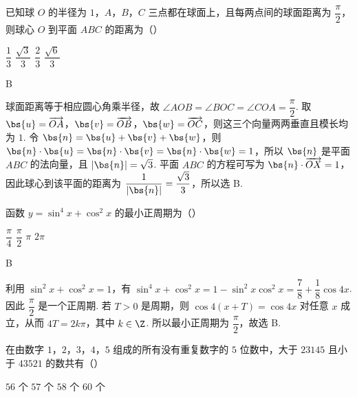 \begin{problem}
已知球 \(O\) 的半径为 \(1\)，\(A\)，\(B\)，\(C\) 三点都在球面上，且每两点间的球面距离为 \(\dfrac{\pi}{2}\)，则球心 \(O\) 到平面 \(ABC\) 的距离为（\quad）

\choices
    {\(\dfrac{1}{3}\)}
    {\(\dfrac{\sqrt3}{3}\)}
    {\(\dfrac{2}{3}\)}
    {\(\dfrac{\sqrt6}{3}\)}
\end{problem}

\begin{answer}
B
\end{answer}

\begin{solution}
球面距离等于相应圆心角乘半径，故 \(\angle AOB=\angle BOC=\angle COA=\dfrac{\pi}{2}\). 取 \(\bs{u}=\overrightarrow{OA}\)，\(\bs{v}=\overrightarrow{OB}\)，\(\bs{w}=\overrightarrow{OC}\)，则这三个向量两两垂直且模长均为 \(1\). 令 \(\bs{n}=\bs{u}+\bs{v}+\bs{w}\)，则 \(\bs{n}\cdot\bs{u}=\bs{n}\cdot\bs{v}=\bs{n}\cdot\bs{w}=1\)，所以 \(\bs{n}\) 是平面 \(ABC\) 的法向量，且 \(\left|\bs{n}\right|=\sqrt3\). 平面 \(ABC\) 的方程可写为 \(\bs{n}\cdot\overrightarrow{OX}=1\)，因此球心到该平面的距离为 \(\dfrac{1}{\left|\bs{n}\right|}=\dfrac{\sqrt3}{3}\)，所以选 B.
\end{solution}

\begin{problem}
函数 \(y=\sin^4x+\cos^2x\) 的最小正周期为（\quad）

\choices
    {\(\dfrac{\pi}{4}\)}
    {\(\dfrac{\pi}{2}\)}
    {\(\pi\)}
    {\(2\pi\)}
\end{problem}

\begin{answer}
B
\end{answer}

\begin{solution}
利用 \(\sin^2x+\cos^2x=1\)，有 \(\sin^4x+\cos^2x=1-\sin^2x\cos^2x=\dfrac{7}{8}+\dfrac{1}{8}\cos4x\). 因此 \(\dfrac{\pi}{2}\) 是一个正周期. 若 \(T>0\) 是周期，则 \(\cos4(x+T)=\cos4x\) 对任意 \(x\) 成立，从而 \(4T=2k\pi\)，其中 \(k\in\Z\). 所以最小正周期为 \(\dfrac{\pi}{2}\)，故选 B.
\end{solution}

\begin{problem}
在由数字 \(1\)，\(2\)，\(3\)，\(4\)，\(5\) 组成的所有没有重复数字的 \(5\) 位数中，大于 \(23145\) 且小于 \(43521\) 的数共有（\quad）

\choices
    {\(56\text{ 个}\)}
    {\(57\text{ 个}\)}
    {\(58\text{ 个}\)}
    {\(60\text{ 个}\)}
\end{problem}

